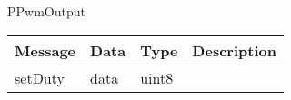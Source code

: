  {PPwmOutput}

\begin{tabular}[ht]{|l|l|l|p{8cm}|}
\hline
Message & Data & Type & Description\\
\hline
setDuty &  data  &  uint8  & \\
\hline
\end{tabular}
